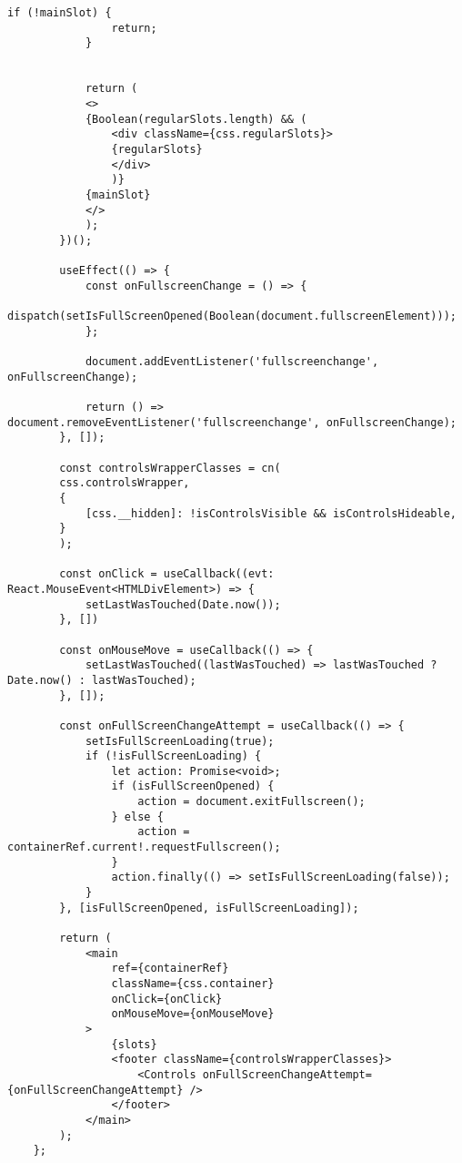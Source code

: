 \begin{lstlisting}[caption={App.tsx}]
			if (!mainSlot) {
				return;
			}
			
			
			return (
			<>
			{Boolean(regularSlots.length) && (
				<div className={css.regularSlots}>
				{regularSlots}
				</div>
				)}
			{mainSlot}
			</>
			);
		})();
		
		useEffect(() => {
			const onFullscreenChange = () => {
				dispatch(setIsFullScreenOpened(Boolean(document.fullscreenElement)));
			};     
			
			document.addEventListener('fullscreenchange', onFullscreenChange);
			
			return () => document.removeEventListener('fullscreenchange', onFullscreenChange);
		}, []);
		
		const controlsWrapperClasses = cn(
		css.controlsWrapper,
		{
			[css.__hidden]: !isControlsVisible && isControlsHideable,
		}
		);
		
		const onClick = useCallback((evt: React.MouseEvent<HTMLDivElement>) => {
			setLastWasTouched(Date.now());
		}, [])
		
		const onMouseMove = useCallback(() => {
			setLastWasTouched((lastWasTouched) => lastWasTouched ? Date.now() : lastWasTouched);
		}, []);
		
		const onFullScreenChangeAttempt = useCallback(() => {
			setIsFullScreenLoading(true);
			if (!isFullScreenLoading) {
				let action: Promise<void>;
				if (isFullScreenOpened) {
					action = document.exitFullscreen();
				} else {
					action = containerRef.current!.requestFullscreen();
				}
				action.finally(() => setIsFullScreenLoading(false));
			}
		}, [isFullScreenOpened, isFullScreenLoading]);
		
		return (
			<main
				ref={containerRef}
				className={css.container}
				onClick={onClick}
				onMouseMove={onMouseMove}
			>
				{slots}
				<footer className={controlsWrapperClasses}>
					<Controls onFullScreenChangeAttempt={onFullScreenChangeAttempt} />
				</footer>
			</main>
		);
	};
\end{lstlisting}

